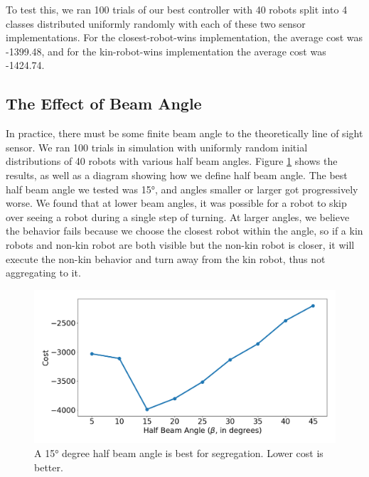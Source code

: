 \documentclass[conference]{IEEEtran}
\begin{document}
    To test this, we ran 100 trials of our best controller with 40 robots split into 4 classes distributed uniformly randomly with each of these two sensor implementations. For the closest-robot-wins implementation, the average cost was -1399.48, and for the kin-robot-wins implementation the average cost was  -1424.74.

  \subsection{The Effect of Beam Angle} \label{section:beam_angle}

    In practice, there must be some finite beam angle to the theoretically line of sight sensor. We ran 100 trials in simulation with uniformly random initial distributions of 40 robots with various half beam angles. Figure \ref{fig:beam_angle} shows the results, as well as a diagram showing how we define half beam angle. The best half beam angle we tested was \ang{15}, and angles smaller or larger got progressively worse. We found that at lower beam angles, it was possible for a robot to skip over seeing a robot during a single step of turning. At larger angles, we believe the behavior fails because we choose the closest robot within the angle, so if a kin robots and non-kin robot are both visible but the non-kin robot is closer, it will execute the non-kin behavior and turn away from the kin robot, thus not aggregating to it.

    \begin{figure}[H]
      \centering
      \includegraphics[width=1\linewidth]{./images/beam_angle.png}
      \caption{A \ang{15} degree half beam angle is best for segregation. Lower cost is better.}
      \label{fig:beam_angle}
    \end{figure}
\end{document}
